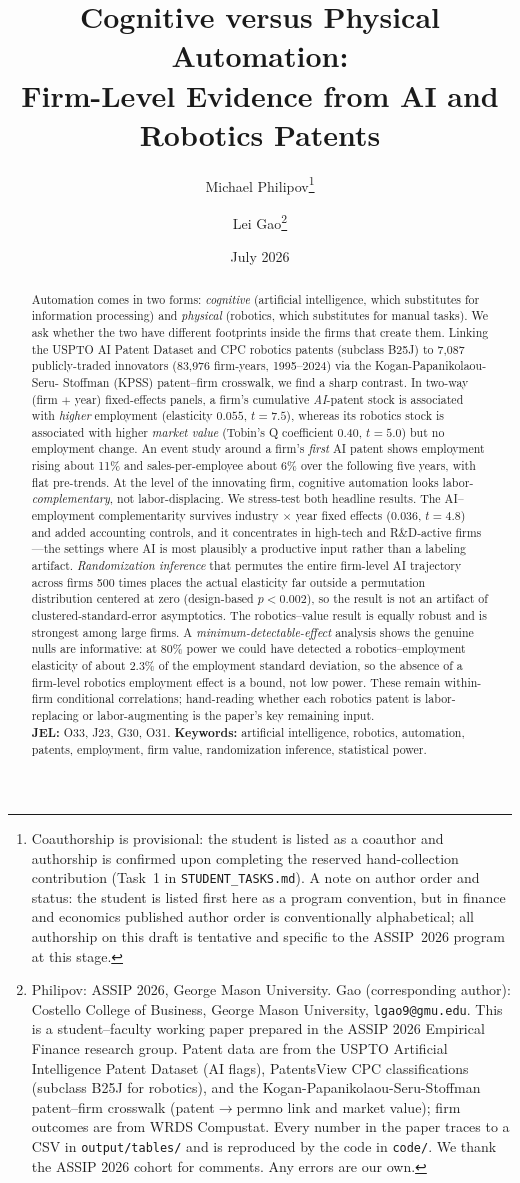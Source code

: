 \documentclass[12pt]{article}
\title{\textbf{Cognitive versus Physical Automation:\\
Firm-Level Evidence from AI and Robotics Patents}}
\author{Michael Philipov\thanks{Coauthorship is provisional: the student is listed as a coauthor and authorship is confirmed upon completing the reserved hand-collection contribution (Task~1 in \texttt{STUDENT\_TASKS.md}). A note on author order and status: the student is listed first here as a program convention, but in finance and economics published author order is conventionally alphabetical; all authorship on this draft is tentative and specific to the ASSIP~2026 program at this stage.} \and Lei Gao\thanks{Philipov: ASSIP 2026, George Mason University.
Gao (corresponding author): Costello College of Business, George Mason University,
\texttt{lgao9@gmu.edu}. This is a student--faculty working paper prepared in the ASSIP 2026
Empirical Finance research group. Patent data are from the USPTO Artificial Intelligence Patent
Dataset (AI flags), PatentsView CPC classifications (subclass B25J for robotics), and the
Kogan-Papanikolaou-Seru-Stoffman patent--firm crosswalk (patent$\to$permno link and market
value); firm outcomes are from WRDS Compustat. Every number in the paper traces to a CSV in
\texttt{output/tables/} and is reproduced by the code in \texttt{code/}. We thank the ASSIP
2026 cohort for comments. Any errors are our own.}}
\date{July 2026}
\begin{document}
\maketitle

\begin{abstract}
\noindent Automation comes in two forms: \emph{cognitive} (artificial intelligence, which
substitutes for information processing) and \emph{physical} (robotics, which substitutes for
manual tasks). We ask whether the two have different footprints inside the firms that create
them. Linking the USPTO AI Patent Dataset and CPC robotics patents (subclass B25J) to 7{,}087
publicly-traded innovators (83{,}976 firm-years, 1995--2024) via the Kogan-Papanikolaou-Seru-
Stoffman (KPSS) patent--firm crosswalk, we find a sharp contrast. In two-way (firm $+$ year)
fixed-effects panels, a firm's cumulative \emph{AI}-patent stock is associated with
\emph{higher} employment (elasticity $0.055$, $t=7.5$), whereas its robotics stock is associated
with higher \emph{market value} (Tobin's Q coefficient $0.40$, $t=5.0$) but no employment change.
An event study around a firm's \emph{first} AI patent shows employment rising about 11\% and
sales-per-employee about 6\% over the following five years, with flat pre-trends. At the level of
the innovating firm, cognitive automation looks labor-\emph{complementary}, not labor-displacing.
We stress-test both headline results. The AI--employment complementarity survives industry
$\times$ year fixed effects ($0.036$, $t=4.8$) and added accounting controls, and it concentrates
in high-tech and R\&D-active firms---the settings where AI is most plausibly a productive input
rather than a labeling artifact. \emph{Randomization inference} that permutes the entire
firm-level AI trajectory across firms 500 times places the actual elasticity far outside a
permutation distribution centered at zero (design-based $p<0.002$), so the result is not an
artifact of clustered-standard-error asymptotics. The robotics--value result is equally robust and
is strongest among large firms. A \emph{minimum-detectable-effect} analysis shows the genuine
nulls are informative: at 80\% power we could have detected a robotics--employment elasticity of
about $2.3\%$ of the employment standard deviation, so the absence of a firm-level robotics
employment effect is a bound, not low power. These remain within-firm conditional correlations;
hand-reading whether each robotics patent is labor-replacing or labor-augmenting is the paper's
key remaining input.\\[4pt]
\noindent\textbf{JEL:} O33, J23, G30, O31. \quad
\textbf{Keywords:} artificial intelligence, robotics, automation, patents, employment, firm value,
randomization inference, statistical power.
\end{abstract}
\end{document}
